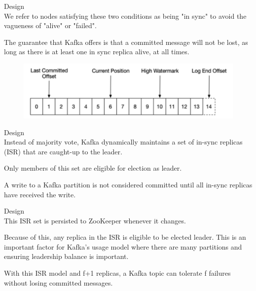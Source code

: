 \begin{frame}[plain,t]{Design} %
     \\
    \vspace{2ex}
    We refer to nodes satisfying these two conditions as being "in sync" to avoid the vagueness of "alive" or "failed". 
    
     \vspace{2ex}
    The guarantee that Kafka offers is that a committed message will not be lost, as long as there is at least one in sync replica alive, at all times.
    
    
    \begin{figure}
        \centering
        \includegraphics[width=0.9\linewidth]{image/0211}
        \label{fig:0211}
    \end{figure}
    
    

    
    
\end{frame}
\begin{frame}[plain,t]{Design} %
     \\
    \vspace{2ex}
    Instead of majority vote, Kafka dynamically maintains a set of in-sync replicas (ISR) that are caught-up to the leader. 
    
     \vspace{2ex}
    Only members of this set are eligible for election as leader. 
    
     \vspace{2ex}
    A write to a Kafka partition is not considered committed until all in-sync replicas have received the write. 
    
    
\end{frame}
\begin{frame}[plain,t]{Design} %
     \\
    \vspace{2ex}
    This ISR set is persisted to ZooKeeper whenever it changes. 
    
    \vspace{2ex}
    Because of this, any replica in the ISR is eligible to be elected leader. This is an important factor for Kafka's usage model where there are many partitions and ensuring leadership balance is important. 
    
    \vspace{2ex}
    With this ISR model and f+1 replicas, a Kafka topic can tolerate f failures without losing committed messages.
    
    
\end{frame}

